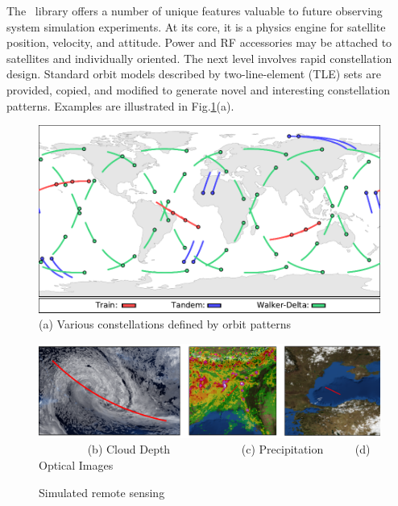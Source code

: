\documentclass[conference]{IEEEtran}
\newcommand{\project}{{\sc{Collaborate}}~}
\begin{document}
The \project library offers a number of unique features valuable to future observing system simulation experiments.  At its core, it is a physics engine for satellite position, velocity, and attitude.  Power and RF accessories may be attached to satellites and individually oriented.  The next level involves rapid constellation design.  Standard orbit models described by two-line-element (TLE) sets are provided, copied, and modified to generate novel and interesting constellation patterns.  Examples are illustrated in Fig.\ref{fig:sensing}(a).

\begin{figure}[b!]
  \begin{minipage}[b]{\linewidth}
    \begin{center}
      \includegraphics[width=\textwidth]{images/constellations.pdf}
      {\footnotesize(a) Various constellations defined by orbit patterns}
    \end{center}
    \medskip
  \end{minipage}
  \begin{minipage}[b]{\linewidth}
    \begin{center}
      \includegraphics[width=\textwidth]{images/remote_sensing.pdf}
      {\footnotesize{
          \color{white}~~~~~~~~\color{black}
          (b) Cloud Depth~~~~~~~~~~~~
          (c) Precipitation~~~~~
          (d) Optical Images}}
    \end{center}
    \medskip
  \end{minipage}
  \caption{Simulated remote sensing}
  \label{fig:sensing}
\end{figure}
\end{document}
